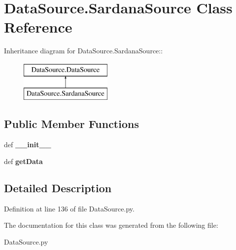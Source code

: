 \hypertarget{classDataSource_1_1SardanaSource}{
\section{DataSource.SardanaSource Class Reference}
\label{classDataSource_1_1SardanaSource}
}
Inheritance diagram for DataSource.SardanaSource::\begin{figure}[H]
\begin{center}
\leavevmode
\includegraphics[height=2cm]{classDataSource_1_1SardanaSource}
\end{center}
\end{figure}
\subsection*{Public Member Functions}
\begin{DoxyCompactItemize}
\item 
\hypertarget{classDataSource_1_1SardanaSource_afc1c370d507b3cdab99a42b37dc4dbb9}{
def {\bfseries \_\-\_\-init\_\-\_\-}}
\label{classDataSource_1_1SardanaSource_afc1c370d507b3cdab99a42b37dc4dbb9}

\item 
\hypertarget{classDataSource_1_1SardanaSource_a234d14b539da090c89d8f08bc164c991}{
def {\bfseries getData}}
\label{classDataSource_1_1SardanaSource_a234d14b539da090c89d8f08bc164c991}

\end{DoxyCompactItemize}


\subsection{Detailed Description}


Definition at line 136 of file DataSource.py.

The documentation for this class was generated from the following file:\begin{DoxyCompactItemize}
\item 
DataSource.py\end{DoxyCompactItemize}
